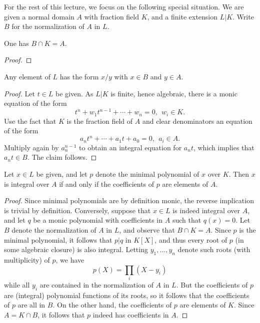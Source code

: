 For the rest of this lecture, we focus on the following special situation.
We are given a normal domain $A$ with fraction field $K$, and a finite extension $L|K$.
Write $B$ for the normalization of $A$ in $L$.

\begin{lemma}
  One has $B \cap K = A$.
\end{lemma}
\begin{proof}
\end{proof}

\begin{lemma}
  Any element of $L$ has the form $x/y$ with $x \in B$ and $y \in A$.
\end{lemma}
\begin{proof}
  Let $t \in L$ be given.
  As $L|K$ is finite, hence algebraic, there is a monic equation of the form
  \[ t^{n} + w_{1} t^{n-1} + \cdots + w_{n} = 0, \ \ w_{i} \in K. \]
  Use the fact that $K$ is the fraction field of $A$ and clear denominators  an equation of the form
  \[ a_{n} t^{n} + \cdots + a_{1} t + a_{0} = 0, \ \ a_{i} \in A. \]
  Multiply again by $a_{n}^{n-1}$ to obtain an integral equation for $a_{n} t$, which implies that $a_{n} t \in B$.
  The claim follows.
\end{proof}

\begin{proposition}
  Let $x \in L$ be given, and let $p$ denote the minimal polynomial of $x$ over $K$.
  Then $x$ is integral over $A$ if and only if the coefficients of $p$ are elements of $A$.
\end{proposition}
\begin{proof}
  Since minimal polynomials are by definition monic, the reverse implication is trivial by definition.
  Conversely, suppose that $x \in L$ is indeed integral over $A$, and let $q$ be a monic polynomial with coefficients in $A$ such that $q(x) = 0$.
  Let $B$ denote the normalization of $A$ in $L$, and observe that $B \cap K = A$.
  Since $p$ is the minimal polynomial, it follows that $p | q$ in $K[X]$, and thus every root of $p$ (in some algebraic closure) is also integral.
  Letting $y_{1},\ldots,y_{n}$ denote such roots (with multiplicity) of $p$, we have
  \[ p(X) = \prod_{i} (X - y_{i}) \]
  while all $y_{i}$ are contained in the normalization of $A$ in $L$.
  But the coefficients of $p$ are (integral) polynomial functions of its roots, so it follows that the coefficients of $p$ are all in $B$.
  On the other hand, the coefficients of $p$ are elements of $K$.
  Since $A = K \cap B$, it follows that $p$ indeed has coefficients in $A$.
\end{proof}

